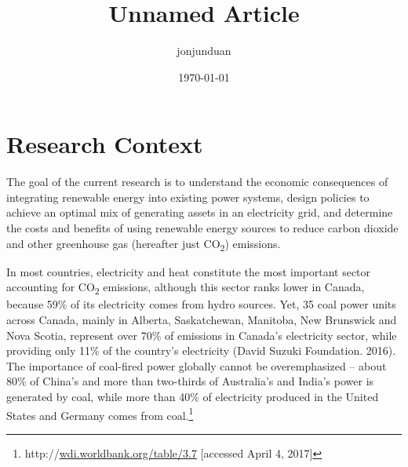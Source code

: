\documentclass[10pt,letter]{article}
\begin{document}
\title{Unnamed Article}



\author[ ]{jonjunduan}%
%




\vspace{-1em}



  \date{\today}


\begingroup
\let\center\flushleft
\let\endcenter\endflushleft
\maketitle
\endgroup







\section{Research Context }\label{research-context}

The goal of the current research is to understand the economic
consequences of integrating renewable energy into existing power
systems, design policies to achieve an optimal mix of generating assets
in an electricity grid, and determine the costs and benefits of using
renewable energy sources to reduce carbon dioxide and other greenhouse
gas (hereafter just CO\textsubscript{2}) emissions.

In most countries, electricity and heat constitute the most important
sector accounting for CO\textsubscript{2} emissions, although this
sector ranks lower in Canada, because 59\% of its electricity comes from
hydro sources. Yet, 35 coal power units across Canada, mainly in
Alberta, Saskatchewan, Manitoba, New Brunswick and Nova Scotia,
represent over 70\% of emissions in Canada's electricity sector, while
providing only 11\% of the country's electricity (David Suzuki
Foundation. 2016). The importance of coal-fired power globally cannot be
overemphasized -- about 80\% of China's and more than two-thirds of
Australia's and India's power is generated by coal, while more than 40\%
of electricity produced in the United States and Germany comes from
coal.\footnote{http://\href{http://wdi.worldbank.org/table/3.7\%20accessed\%20September\%2018}{wdi.worldbank.org/table/3.7}
  {[}accessed April 4, 2017{]}}
\end{document}
